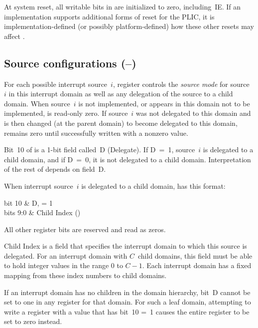 At system reset, all writable bits in  are initialized to
zero, including~IE.
If an implementation supports additional forms of reset for the PLIC,
it is implementation-defined (or possibly platform-defined) how these
other resets may affect .

\subsection{%
Source configurations
 (--)%
}
\label{sec:AdvPLIC-reg-sourcecfg}

For each possible interrupt source~$i$, register 
controls the \emph{source mode} for source~$i$ in this interrupt domain
as well as any delegation of the source to a child domain.
When source~$i$ is not implemented, or appears in this domain not to be
implemented,  is read-only zero.
If source~$i$ was not delegated to this domain and is then
changed (at the parent domain) to become delegated to this domain,
 remains zero until successfully written with a
nonzero value.

Bit~10 of  is a \mbox{1-bit} field called~D
(Delegate).
If D~=~1, source~$i$ is delegated to a child domain, and if D~=~0, it
is not delegated to a child domain.
Interpretation of the rest of  depends on field~D.

When interrupt source~$i$ is delegated to a child domain,
 has this format:\nopagebreak
\begin{displayLinesTable}[l@{\qquad}l]
bit 10   & D, = 1 \\
bits 9:0 & Child Index (\WLRL) \\
\end{displayLinesTable}
All other register bits are reserved and read as zeros.

Child Index is a {\WLRL} field that specifies the interrupt domain to
which this source is delegated.
For an interrupt domain with $C$~child domains, this field must be able
to hold integer values in the range 0 to ${C-\mbox{1}}$.
Each interrupt domain has a fixed mapping from these index numbers to
child domains.

If an interrupt domain has no children in the domain hierarchy, bit~D
cannot be set to one in any  register for that domain.
For such a leaf domain, attempting to write a  register
with a value that has bit~10 =~1 causes the entire register to be set
to zero instead.

